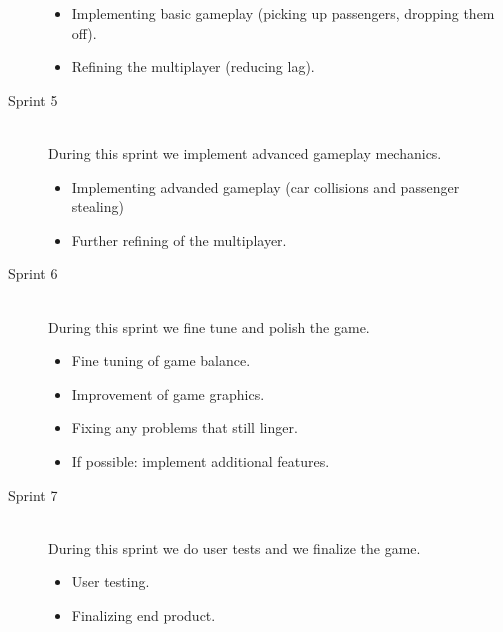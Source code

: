 \documentclass{article}
\begin{document}
\begin{description}
\begin{itemize}
\item Implementing basic gameplay (picking up passengers, dropping them off).
\item Refining the multiplayer (reducing lag).
\end{itemize}
\item[Sprint 5] \hfill \\
During this sprint we implement advanced gameplay mechanics.
\begin{itemize}
\item Implementing advanded gameplay (car collisions and passenger stealing)
\item Further refining of the multiplayer.
\end{itemize}
\item[Sprint 6] \hfill \\
During this sprint we fine tune and polish the game.
\begin{itemize}
\item Fine tuning of game balance.
\item Improvement of game graphics.
\item Fixing any problems that still linger.
\item If possible: implement additional features.
\end{itemize}
\item[Sprint 7] \hfill \\
During this sprint we do user tests and we finalize the game.
\begin{itemize}
\item User testing.
\item Finalizing end product.
\end{itemize}
\end{description}
\end{document}
